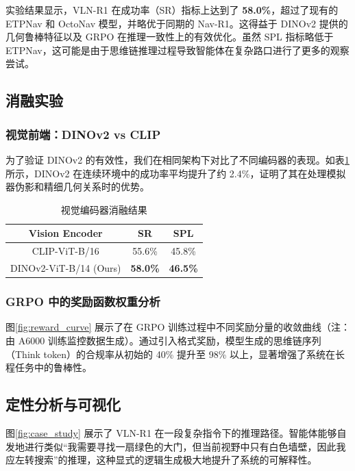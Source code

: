 实验结果显示，VLN-R1 在成功率（SR）指标上达到了 \textbf{58.0\%}，超过了现有的 ETPNav 和 OctoNav 模型，并略优于同期的 Nav-R1。这得益于 DINOv2 提供的几何鲁棒特征以及 GRPO 在推理一致性上的有效优化。虽然 SPL 指标略低于 ETPNav，这可能是由于思维链推理过程导致智能体在复杂路口进行了更多的观察尝试。

\subsection{消融实验}

\subsubsection{视觉前端：DINOv2 vs CLIP}
为了验证 DINOv2 的有效性，我们在相同架构下对比了不同编码器的表现。如表\ref{tab:ablation_vision}所示，DINOv2 在连续环境中的成功率平均提升了约 2.4\%，证明了其在处理模拟器伪影和精细几何关系时的优势。

\begin{table}[htbp]
\centering
\caption{视觉编码器消融结果}
\label{tab:ablation_vision}
\begin{tabular}{c|cc}
\hline
\textbf{Vision Encoder} & \textbf{SR} & \textbf{SPL} \\ \hline
CLIP-ViT-B/16 & 55.6\% & 45.8\% \\
DINOv2-ViT-B/14 (Ours) & \textbf{58.0\%} & \textbf{46.5\%} \\ \hline
\end{tabular}
\end{table}

\subsubsection{GRPO 中的奖励函数权重分析}
图\ref{fig:reward_curve} 展示了在 GRPO 训练过程中不同奖励分量的收敛曲线（注：由 A6000 训练监控数据生成）。通过引入格式奖励，模型生成的思维链序列（Think token）的合规率从初始的 40\% 提升至 98\% 以上，显著增强了系统在长程任务中的鲁棒性。

\subsection{定性分析与可视化}
图\ref{fig:case_study} 展示了 VLN-R1 在一段复杂指令下的推理路径。智能体能够自发地进行类似“我需要寻找一扇绿色的大门，但当前视野中只有白色墙壁，因此我应左转搜索”的推理，这种显式的逻辑生成极大地提升了系统的可解释性。
